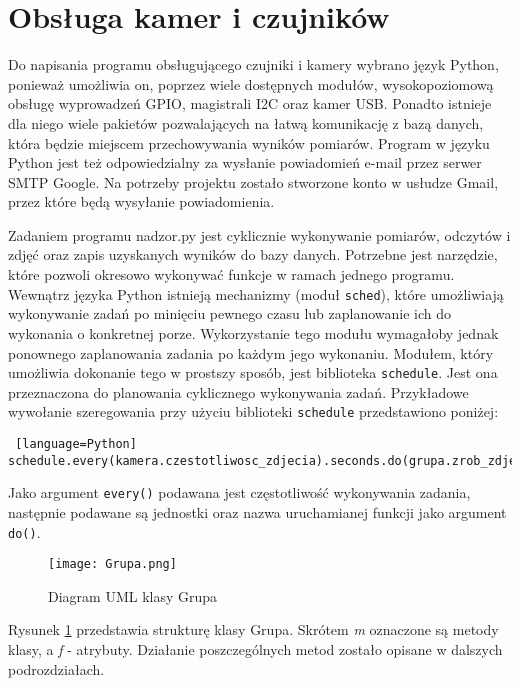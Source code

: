 \documentclass[a4paper,11pt,twoside]{article}
\begin{document}
\newpage
\section{Obsługa kamer i czujników}
Do napisania programu obsługującego czujniki i kamery wybrano język Python, ponieważ umożliwia on, poprzez wiele dostępnych modułów, wysokopoziomową obsługę wyprowadzeń GPIO, magistrali I2C oraz kamer USB. Ponadto istnieje dla niego wiele pakietów pozwalających na łatwą komunikację z bazą danych, która będzie miejscem przechowywania wyników pomiarów. Program w języku Python jest też odpowiedzialny za wysłanie powiadomień e-mail przez serwer SMTP Google. Na potrzeby projektu zostało stworzone konto w usłudze Gmail, przez które będą wysyłanie powiadomienia. 

Zadaniem programu nadzor.py jest cyklicznie wykonywanie pomiarów, odczytów i zdjęć oraz zapis uzyskanych wyników do bazy danych. Potrzebne jest narzędzie, które pozwoli okresowo wykonywać funkcje w ramach jednego programu. Wewnątrz języka Python istnieją mechanizmy (moduł \texttt{sched}), które umożliwiają wykonywanie zadań po minięciu pewnego czasu lub zaplanowanie ich do wykonania o konkretnej porze. Wykorzystanie tego modułu wymagałoby jednak ponownego zaplanowania zadania po każdym jego wykonaniu. Modułem, który umożliwia dokonanie tego w prostszy sposób, jest biblioteka \texttt{schedule}. Jest ona przeznaczona do planowania cyklicznego wykonywania zadań. Przykładowe wywołanie szeregowania przy użyciu biblioteki \texttt{schedule} przedstawiono poniżej:
\begin{lstlisting} [language=Python]
schedule.every(kamera.czestotliwosc_zdjecia).seconds.do(grupa.zrob_zdjecie)
\end{lstlisting}
Jako argument \texttt{every()} podawana jest częstotliwość wykonywania zadania, następnie podawane są jednostki oraz nazwa uruchamianej funkcji jako argument \texttt{do()}.

\begin{figure}[h]
\begin{center}
\texttt{[image: Grupa.png]}
\caption{Diagram UML klasy Grupa}
\label{fig: Grupa}
\end{center}
\end{figure}

Rysunek \ref{fig: Grupa} przedstawia strukturę klasy Grupa. Skrótem \textit{m} oznaczone są metody klasy, a \textit{f} - atrybuty. Działanie poszczególnych metod zostało opisane w dalszych podrozdziałach. 
\end{document}
